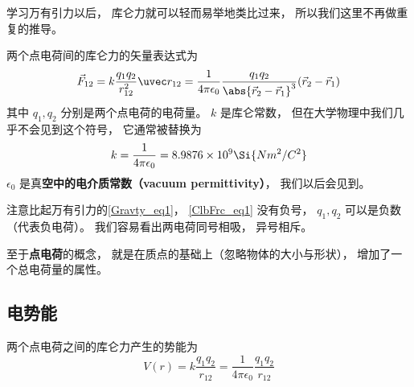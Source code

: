 

学习万有引力以后， 库仑力就可以轻而易举地类比过来， 所以我们这里不再做重复的推导。

两个点电荷间的库仑力的矢量表达式为
\begin{equation}\label{ClbFrc_eq1}
\vec F_{12} = k\frac{q_1 q_2}{r_{12}^2} \uvec r_{12} = \frac{1}{4\pi\epsilon_0} \frac{q_1 q_2}{\abs{\vec r_2 - \vec r_1}^3}(\vec r_2 - \vec r_1)
\end{equation}
其中 $q_1, q_2$ 分别是两个点电荷的电荷量。 $k$ 是库仑常数， 但在大学物理中我们几乎不会见到这个符号， 它通常被替换为
\begin{equation}
k = \frac{1}{4\pi\epsilon_0} = 8.9876\times 10^9 \Si{N m^2/C^2}
\end{equation}
$\epsilon_0$ 是真\textbf{空中的电介质常数（vacuum permittivity）}， 我们以后会见到。

注意比起万有引力的\autoref{Gravty_eq1}， \autoref{ClbFrc_eq1} 没有负号， $q_1, q_2$ 可以是负数（代表负电荷）。 我们容易看出两电荷同号相吸， 异号相斥。

至于\textbf{点电荷}的概念， 就是在质点的基础上（忽略物体的大小与形状）， 增加了一个总电荷量的属性。

\subsection{电势能}
两个点电荷之间的库仑力产生的势能为
\begin{equation}
V(r) = k \frac{q_1 q_2}{r_{12}} = \frac{1}{4\pi\epsilon_0} \frac{q_1 q_2}{r_{12}}
\end{equation}


